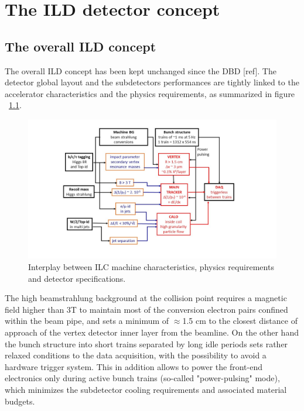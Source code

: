 \chapter{The ILD detector concept}


\section{The overall ILD concept}

The overall ILD concept has been kept unchanged since the DBD [ref]. The detector global layout and the subdetectors performances are tightly linked to the accelerator characteristics and the physics requirements, as summarized in figure ~\ref{fig:ILD:specifications}. 

\begin{figure}[t!]
\centering
\includegraphics[width=1.2\hsize]{ILD/fig/ILD_specifications.jpg}
\caption{Interplay between ILC machine characteristics, physics requirements and detector specifications.}
\label{fig:ILD:specifications}
\end{figure}
	
The high beamstrahlung background at the collision point requires a magnetic field higher than 3T to maintain most of the conversion electron pairs confined within the beam pipe, and sets a minimum of $\approx$1.5 cm to the closest distance of approach of the vertex detector inner layer from the beamline. On the other hand the bunch structure into short trains separated by long idle periods sets rather relaxed conditions to the data acquisition, with the possibility to avoid a hardware trigger system. This in addition allows to power the front-end electronics only during active bunch trains (so-called "power-pulsing" mode), which minimizes the subdetector cooling requirements and associated material budgets.  

